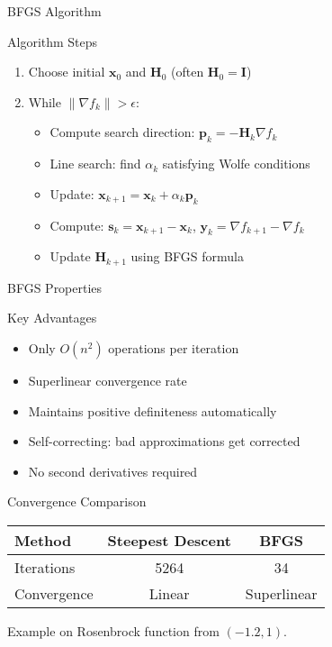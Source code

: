 \documentclass[aspectratio=1610]{beamer}
\begin{document}
\begin{frame}{BFGS Algorithm}
  \begin{block}{Algorithm Steps}
    \begin{enumerate}
      \item Choose initial $\mathbf{x}_0$ and $\mathbf{H}_0$ (often $\mathbf{H}_0 = \mathbf{I}$)
      \item While $\|\nabla f_k\| > \epsilon$:
      \begin{itemize}
        \item Compute search direction: $\mathbf{p}_k = -\mathbf{H}_k \nabla f_k$
        \item Line search: find $\alpha_k$ satisfying Wolfe conditions
        \item Update: $\mathbf{x}_{k+1} = \mathbf{x}_k + \alpha_k \mathbf{p}_k$
        \item Compute: $\mathbf{s}_k = \mathbf{x}_{k+1} - \mathbf{x}_k$, $\mathbf{y}_k = \nabla f_{k+1} - \nabla f_k$
        \item Update $\mathbf{H}_{k+1}$ using BFGS formula
      \end{itemize}
    \end{enumerate}
  \end{block}
\end{frame}

\begin{frame}{BFGS Properties}
  \begin{block}{Key Advantages}
    \begin{itemize}
      \item Only $O(n^2)$ operations per iteration
      \item Superlinear convergence rate
      \item Maintains positive definiteness automatically
      \item Self-correcting: bad approximations get corrected
      \item No second derivatives required
    \end{itemize}
  \end{block}
  
  \vspace{0.5cm}
  \begin{block}{Convergence Comparison}
    \begin{center}
    \begin{tabular}{|l|c|c|}
    \hline
    Method & Steepest Descent & BFGS \\
    \hline
    Iterations & 5264 & 34 \\
    Convergence & Linear & Superlinear \\
    \hline
    \end{tabular}
    \end{center}
    Example on Rosenbrock function from $(-1.2, 1)$.
  \end{block}
\end{frame}
\end{document}
